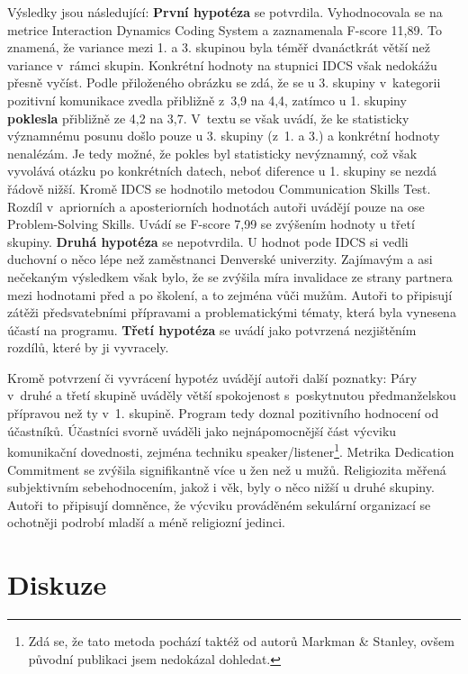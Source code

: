 Výsledky jsou následující:
{\bf První hypotéza} se potvrdila. Vyhodnocovala se na metrice Interaction Dynamics
Coding System a zaznamenala F-score 11,89. To znamená, že variance mezi 1. a 3.
skupinou byla téměř dvanáctkrát větší než variance v~rámci skupin. Konkrétní
hodnoty na stupnici IDCS však nedokážu přesně vyčíst. Podle přiloženého obrázku se zdá, že
se u 3. skupiny v~kategorii pozitivní komunikace zvedla přibližně z~3,9 na 4,4,
zatímco u 1. skupiny \textbf{poklesla} přibližně ze 4,2 na 3,7. V~textu se však uvádí,
že ke statisticky významnému posunu došlo pouze u 3. skupiny (z~1. a 3.) a
konkrétní hodnoty nenalézám. Je tedy možné, že pokles byl statisticky
nevýznamný, což však vyvolává otázku po konkrétních datech, neboť diference u 1.
skupiny se nezdá řádově nižší.
Kromě IDCS se hodnotilo metodou Communication Skills Test. Rozdíl v~apriorních a
aposteriorních hodnotách autoři uvádějí pouze na ose Problem-Solving Skills.
Uvádí se F-score 7,99 se zvýšením hodnoty u třetí skupiny.
{\bf Druhá hypotéza} se nepotvrdila. U hodnot pode IDCS si vedli duchovní o něco lépe
než zaměstnanci Denverské univerzity. Zajímavým a asi nečekaným výsledkem však
bylo, že se zvýšila míra invalidace ze strany partnera mezi hodnotami před a po
školení, a to zejména vůči mužům. Autoři to připisují zátěži předsvatebními
přípravami a problematickými tématy, která byla vynesena účastí na programu.
{\bf Třetí hypotéza} se uvádí jako potvrzená nezjištěním rozdílů, které by ji
vyvracely.

Kromě potvrzení či vyvrácení hypotéz uvádějí autoři další poznatky: Páry v~druhé
a třetí skupině uváděly větší spokojenost s~poskytnutou předmanželskou přípravou
než ty v~1. skupině. Program tedy doznal pozitivního hodnocení od účastníků.
Účastníci svorně uváděli jako nejnápomocnější část výcviku komunikační
dovednosti, zejména techniku speaker/listener\footnote{Zdá se, že tato metoda
pochází taktéž od autorů Markman \& Stanley, ovšem původní publikaci jsem
nedokázal dohledat.}. Metrika Dedication Commitment se
zvýšila signifikantně více u žen než u mužů. Religiozita měřená subjektivním
sebehodnocením, jakož i věk, byly o něco nižší u druhé skupiny. Autoři to
připisují domněnce, že výcviku prováděném sekulární organizací se ochotněji
podrobí mladší a méně religiozní jedinci.

\vspace{15mm}
\chapter{Diskuze}


